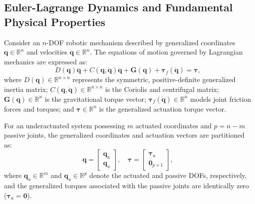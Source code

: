 \documentclass[lettersize,journal]{IEEEtran}
\begin{document}
\subsection{Euler-Lagrange Dynamics and Fundamental Physical Properties}
Consider an $n$-DOF robotic mechanism described by generalized coordinates $\bm{q} \in \mathbb{R}^n$ and velocities $\dot{\bm{q}} \in \mathbb{R}^n$. The equations of motion governed by Lagrangian mechanics are expressed as:
\begin{equation}
    D(\bm{q})\ddot{\bm{q}} + C(\bm{q}, \dot{\bm{q}})\dot{\bm{q}} + \bm{G}(\bm{q}) + \bm{\tau}_f(\dot{\bm{q}}) = \bm{\tau},
    \label{eq:eom}
\end{equation}
where $D(\bm{q}) \in \mathbb{R}^{n \times n}$ represents the symmetric, positive-definite generalized inertia matrix; $C(\bm{q}, \dot{\bm{q}}) \in \mathbb{R}^{n \times n}$ is the Coriolis and centrifugal matrix; $\bm{G}(\bm{q}) \in \mathbb{R}^n$ is the gravitational torque vector; $\bm{\tau}_f(\dot{\bm{q}}) \in \mathbb{R}^n$ models joint friction forces and torques; and $\bm{\tau} \in \mathbb{R}^n$ is the generalized actuation torque vector.

For an underactuated system possessing $m$ actuated coordinates and $p = n - m$ passive joints, the generalized coordinates and actuation vectors are partitioned as:
\begin{equation}
    \bm{q} = \begin{bmatrix} \bm{q}_a \\ \bm{q}_u \end{bmatrix}, \quad \bm{\tau} = \begin{bmatrix} \bm{\tau}_a \\ \mathbf{0}_{p \times 1} \end{bmatrix},
    \label{eq:partition}
\end{equation}
where $\bm{q}_a \in \mathbb{R}^m$ and $\bm{q}_u \in \mathbb{R}^p$ denote the actuated and passive DOFs, respectively, and the generalized torques associated with the passive joints are identically zero ($\bm{\tau}_u = \mathbf{0}$).
\end{document}
